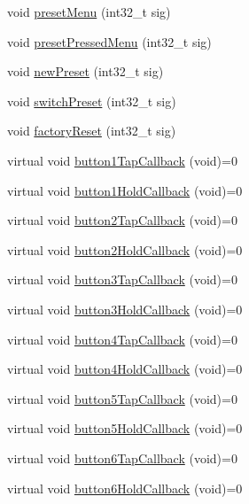 \begin{DoxyCompactItemize}
void \mbox{\hyperlink{class_via_u_i_a5a2d75e2625e2b55f0588ba8925fe45f}{preset\+Menu}} (int32\+\_\+t sig)
\item 
void \mbox{\hyperlink{class_via_u_i_a3f67bd0f296939ab1be2bdef56858fd6}{preset\+Pressed\+Menu}} (int32\+\_\+t sig)
\item 
void \mbox{\hyperlink{class_via_u_i_a3ead361fc18c9079dcd97b9f34124898}{new\+Preset}} (int32\+\_\+t sig)
\item 
void \mbox{\hyperlink{class_via_u_i_af3a811550d54835d446c425dc57fa157}{switch\+Preset}} (int32\+\_\+t sig)
\item 
void \mbox{\hyperlink{class_via_u_i_a04eb56786faec693ef8cbf4d41384ca1}{factory\+Reset}} (int32\+\_\+t sig)
\item 
virtual void \mbox{\hyperlink{class_via_u_i_a5bdacaef84e33fb3d9b3dd50d1b269d1}{button1\+Tap\+Callback}} (void)=0
\item 
virtual void \mbox{\hyperlink{class_via_u_i_a62145ce1c1b664ff0a1aadaac9386162}{button1\+Hold\+Callback}} (void)=0
\item 
virtual void \mbox{\hyperlink{class_via_u_i_a8fce17e375ea6fe3a4746bff3e6dec75}{button2\+Tap\+Callback}} (void)=0
\item 
virtual void \mbox{\hyperlink{class_via_u_i_a95bce2d662a8ae46be73497e868aebb9}{button2\+Hold\+Callback}} (void)=0
\item 
virtual void \mbox{\hyperlink{class_via_u_i_a3dfd40d901aaa8c8310bdbf75f4432a5}{button3\+Tap\+Callback}} (void)=0
\item 
virtual void \mbox{\hyperlink{class_via_u_i_a7334aea36cf78afac284dd5e899e8ace}{button3\+Hold\+Callback}} (void)=0
\item 
virtual void \mbox{\hyperlink{class_via_u_i_a4925f089aa720ca88d84246f434112e9}{button4\+Tap\+Callback}} (void)=0
\item 
virtual void \mbox{\hyperlink{class_via_u_i_a11919091b39319fe4d1b3a3f3c7104c5}{button4\+Hold\+Callback}} (void)=0
\item 
virtual void \mbox{\hyperlink{class_via_u_i_a5066c22385f31c24ec939d680a66a628}{button5\+Tap\+Callback}} (void)=0
\item 
virtual void \mbox{\hyperlink{class_via_u_i_aee783713c816e3807514ee9b06b571b0}{button5\+Hold\+Callback}} (void)=0
\item 
virtual void \mbox{\hyperlink{class_via_u_i_a8a6bf29d336faa8e9d026a84be45d956}{button6\+Tap\+Callback}} (void)=0
\item 
virtual void \mbox{\hyperlink{class_via_u_i_afa66f7946b6cf755b94383715b26a651}{button6\+Hold\+Callback}} (void)=0

\end{DoxyCompactItemize}
